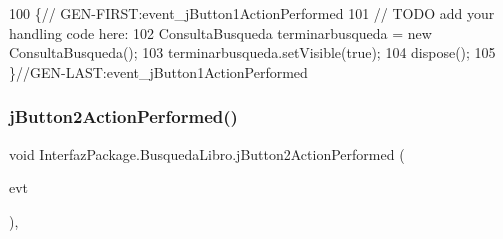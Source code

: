 \begin{DoxyCode}
100                                                                          \{\textcolor{comment}{//
      GEN-FIRST:event\_jButton1ActionPerformed}
101         \textcolor{comment}{// TODO add your handling code here:}
102         ConsultaBusqueda terminarbusqueda = \textcolor{keyword}{new} ConsultaBusqueda();
103         terminarbusqueda.setVisible(\textcolor{keyword}{true});
104         dispose();
105     \}\textcolor{comment}{//GEN-LAST:event\_jButton1ActionPerformed}
\end{DoxyCode}
\mbox{\label{class_interfaz_package_1_1_busqueda_libro_afde7a423c97ad3cae7c3b1ea66ea54c2}} 
\subsubsection{\texorpdfstring{j\+Button2\+Action\+Performed()}{jButton2ActionPerformed()}}
{\footnotesize\ttfamily void Interfaz\+Package.\+Busqueda\+Libro.\+j\+Button2\+Action\+Performed (\begin{DoxyParamCaption}\item[{java.\+awt.\+event.\+Action\+Event}]{evt }\end{DoxyParamCaption})\hspace{0.3cm}{\ttfamily [inline]}, {\ttfamily [private]}}



